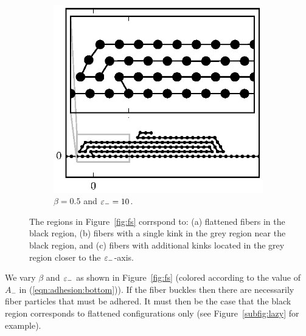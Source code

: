 \begin{figure}[h!]
		\begin{subfigure}{.5\textwidth}
			\centering
			\includegraphics{./fig/ch3/fs/b0.5_eb10.eps}
			\caption{$\beta=0.5$ and $\varepsilon_-=10$.\label{subfig:lazy_many_loops}}
		\end{subfigure}		
		\caption{The regions in Figure~\ref{fig:fs} corrspond to: (a) flattened fibers in the black region, (b) fibers with a single kink in the grey region near the black region, and (c) fibers with additional kinks located in the grey region closer to the $\varepsilon_-$-axis.\label{fig:lazy}}	
	\end{figure}

We vary $\beta$ and $\varepsilon_-$ as shown in Figure~\ref{fig:fs} (colored according to the value of $A_-$ in (\ref{eqn:adhesion:bottom})). If the fiber buckles then there are necessarily fiber particles that must be adhered. It must then be the case that the black region corresponds to flattened configurations only (see Figure~\ref{subfig:lazy} for example). 

